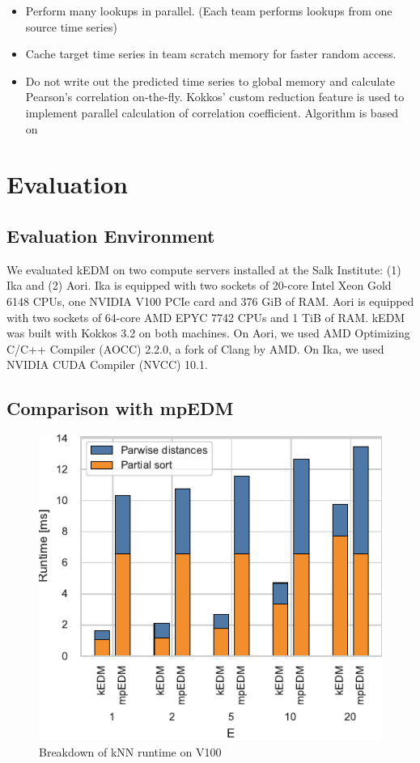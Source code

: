 \documentclass[conference]{IEEEtran}
\begin{document}
\begin{itemize}
\item Perform many lookups in parallel. (Each team performs lookups from one
    source time series)
\item Cache target time series in team scratch memory for faster random
    access.
\item Do not write out the predicted time series to global memory and
    calculate Pearson’s correlation on-the-fly. Kokkos’ custom reduction
    feature is used to implement parallel calculation of correlation
    coefficient. Algorithm is based on~\cite{Schubert2018}
\end{itemize}

\section{Evaluation}

\subsection{Evaluation Environment}


We evaluated kEDM on two compute servers installed at the Salk Institute: (1)
Ika and (2) Aori.
Ika is equipped with two sockets of 20-core Intel Xeon Gold 6148 CPUs, one
NVIDIA V100 PCIe card and 376 GiB of RAM. Aori is equipped with two sockets of
64-core AMD EPYC 7742 CPUs and 1 TiB of RAM.
kEDM was built with Kokkos 3.2 on both machines. On Aori, we used AMD
Optimizing C/C++ Compiler (AOCC) 2.2.0, a fork of Clang by AMD. On Ika, we
used NVIDIA CUDA Compiler (NVCC) 10.1.

\subsection{Comparison with mpEDM}

\begin{figure}
    \centering
    \includegraphics{figs/breakdown_knn_v100}
    \caption{Breakdown of kNN runtime on V100}%
    \label{fig:architecture}
\end{figure}
\end{document}
